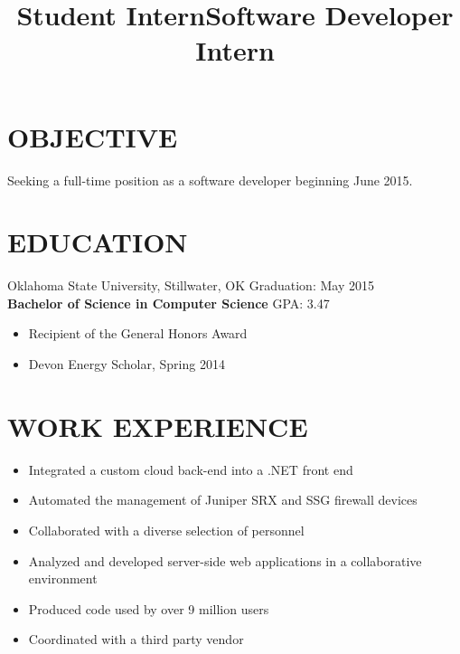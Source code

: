 \documentclass[line, overlapped]{res}
\begin{document}
\address{1875 Arbor Valley Dr \\ Edmond, OK 73025 \\ (405) 598-7827 \\ brandon@brandonsilver.com}

\begin{resume}
    \section{OBJECTIVE}
    
    Seeking a full-time position as a software developer beginning June 2015.

    \section{EDUCATION}

    Oklahoma State University, Stillwater, OK \hfill Graduation: May 2015 \\
    \textbf{Bachelor of Science in Computer Science} \hfill GPA: 3.47
    \begin{itemize}
        \item Recipient of the General Honors Award
        \item Devon Energy Scholar, Spring 2014
    \end{itemize}


	\section{WORK EXPERIENCE} 

    \title{Student Intern}
    \begin{position}
        \begin{itemize}
            \item Integrated a custom cloud back-end into a .NET front end
            \item Automated the management of Juniper SRX and SSG firewall devices
            \item Collaborated with a diverse selection of personnel
    \end{itemize}
    \end{position}

    \title{Software Developer Intern}
    \begin{position}
        \begin{itemize}
            \item Analyzed and developed server-side web applications in a collaborative environment
            \item Produced code used by over 9 million users
            \item Coordinated with a third party vendor
    \end{itemize}
    \end{position} 


\end{resume}
\end{document}
